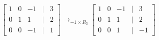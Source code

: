 \documentclass[preview]{standalone}
\begin{document}
\begin{align*}
\begin{bmatrix} 1 & 0 & -1 & | & 3 \\ 0 & 1 & 1 & | & 2 \\ 0 & 0 & -1 & | & 1 \end{bmatrix} \rightarrow_{-1\times R_3} \begin{bmatrix} 1 & 0 & -1 & | & 3 \\ 0 & 1 & 1 & | & 2 \\ 0 & 0 & 1 & | & -1 \end{bmatrix}
\end{align*}
\end{document}
